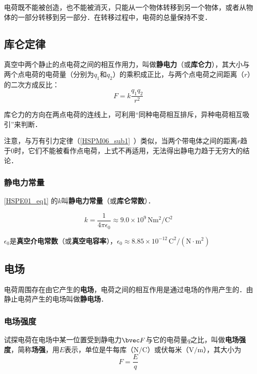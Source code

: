 电荷既不能被创造，也不能被消灭，只能从一个物体转移到另一个物体，或者从物体的一部分转移到另一部分．在转移过程中，电荷的总量保持不变．

\subsection{库仑定律}

真空中两个静止的点电荷之间的相互作用力，叫做\textbf{静电力}（或\textbf{库仑力}），其大小与两个点电荷的电荷量（分别为$q_1$和$q_2$）的乘积成正比，与两个点电荷之间距离（$r$）的二次方成反比：
\begin{equation}\label{HSPE01_eq1}
F=k \frac{q_1 q_2}{r^2}
\end{equation}

库仑力的方向在两点电荷的连线上，可利用“同种电荷相互排斥，异种电荷相互吸引”来判断．

注意，与万有引力定律（\autoref{HSPM06_sub1}~）类似，当两个带电体之间的距离$r$趋于$0$时，它们不能被看作点电荷，上式不再适用，无法得出静电力趋于无穷大的结论．

\subsubsection{静电力常量}

\autoref{HSPE01_eq1} 的$k$叫\textbf{静电力常量}（或\textbf{库仑常数}）．

\begin{equation}
k = \frac{1}{4\pi\epsilon_0} \approx 9.0 \times 10^{9} \,\mathrm{N m^2/C^2}
\end{equation}

$\epsilon_0$是\textbf{真空介电常数}（或\textbf{真空电容率}），$\epsilon_0 \approx 8.85 \times 10^{-12}  \,\mathrm{C^2/(N \cdot m^2)}$

\subsection{电场}

电荷周围存在由它产生的\textbf{电场}，电荷之间的相互作用是通过电场的作用产生的．由静止电荷产生的电场叫做\textbf{静电场}．

\subsubsection{电场强度}

试探电荷在电场中某一位置受到静电力$\bvec F$与它的电荷量$q$之比，叫做\textbf{电场强度}，简称\textbf{场强}，用$E$表示，单位是牛每库（$\mathrm{N/C}$）或伏每米（$\mathrm{V/m}$），其大小为
\begin{equation}\label{HSPE01_eq2}
F=\frac {E}{q}
\end{equation}

